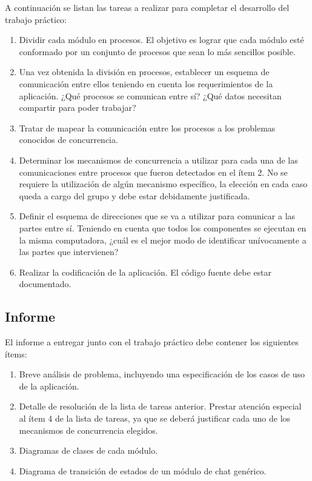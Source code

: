 A continuación se listan las tareas a realizar para completar el desarrollo del trabajo práctico:
\begin{enumerate}
  \item Dividir cada módulo en procesos.  El objetivo es lograr que cada módulo esté conformado por un conjunto de procesos que sean lo más sencillos posible.
  \item Una vez obtenida la división en procesos, establecer un esquema de comunicación entre ellos teniendo en cuenta los requerimientos de la aplicación.  ¿Qué procesos se comunican entre sí?  ¿Qué datos necesitan compartir para poder trabajar?
  \item Tratar de mapear la comunicación entre los procesos a los problemas conocidos de concurrencia.
  \item Determinar los mecanismos de concurrencia a utilizar para cada una de las comunicaciones entre procesos que fueron detectados en el ítem 2.  No se requiere la utilización de algún mecanismo específico, la elección en cada caso queda a cargo del grupo y debe estar debidamente justificada.
  \item Definir el esquema de direcciones que se va a utilizar para comunicar a las partes entre sí. Teniendo en cuenta que todos los componentes se ejecutan en la misma computadora, ¿cuál es el mejor modo de identificar unívocamente a las partes que intervienen?
  \item Realizar la codificación de la aplicación.  El código fuente debe estar documentado.
\end{enumerate}

\subsection*{Informe}

El informe a entregar junto con el trabajo práctico debe contener los siguientes ítems:
\begin{enumerate}
  \item Breve análisis de problema, incluyendo una especificación de los casos de uso de la aplicación.
  \item Detalle de resolución de la lista de tareas anterior.  Prestar atención especial al ítem 4 de la lista de tareas, ya que se deberá justificar cada uno de los mecanismos de concurrencia elegidos.
  \item Diagramas de clases de cada módulo.
  \item Diagrama de transición de estados de un módulo de chat genérico.
\end{enumerate}

